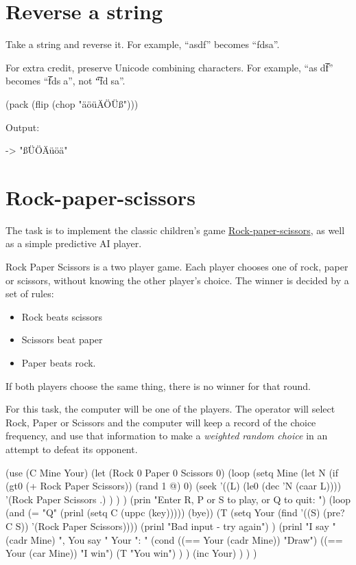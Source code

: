 \pagebreak{}
\section*{Reverse a string}

Take a string and reverse it. For example, ``asdf'' becomes ``fdsa''.

For extra credit, preserve Unicode combining characters. For example,
``as⃝df̅'' becomes ``f̅ds⃝a'', not ``̅fd⃝sa''.

\begin{wideverbatim}

(pack (flip (chop "äöüÄÖÜß")))

Output:

-> "ßÜÖÄüöä"

\end{wideverbatim}

\pagebreak{}
\section*{Rock-paper-scissors}

The task is to implement the classic children's game
\href{http://en.wikipedia.org/wiki/Rock-paper-scissors}{Rock-paper-scissors},
as well as a simple predictive AI player.

Rock Paper Scissors is a two player game. Each player chooses one of
rock, paper or scissors, without knowing the other player's choice. The
winner is decided by a set of rules:

\begin{itemize}
\item
  Rock beats scissors
\item
  Scissors beat paper
\item
  Paper beats rock.
\end{itemize}

If both players choose the same thing, there is no winner for that
round.

For this task, the computer will be one of the players. The operator
will select Rock, Paper or Scissors and the computer will keep a record
of the choice frequency, and use that information to make a
\emph{weighted random choice} in an attempt
to defeat its opponent.

\begin{wideverbatim}

(use (C Mine Your)
   (let (Rock 0  Paper 0  Scissors 0)
      (loop
         (setq Mine
            (let N (if (gt0 (+ Rock Paper Scissors)) (rand 1 @) 0)
               (seek
                  '((L) (le0 (dec 'N (caar L))))
                  '(Rock Paper Scissors .) ) ) )
         (prin "Enter R, P or S to play, or Q to quit: ")
         (loop
            (and (= "Q" (prinl (setq C (uppc (key))))) (bye))
            (T (setq Your (find '((S) (pre? C S)) '(Rock Paper Scissors))))
            (prinl "Bad input - try again") )
         (prinl
            "I say " (cadr Mine) ", You say " Your ": "
            (cond
               ((== Your (cadr Mine)) "Draw")
               ((== Your (car Mine)) "I win")
               (T "You win") ) )
         (inc Your) ) ) )

\end{wideverbatim}


